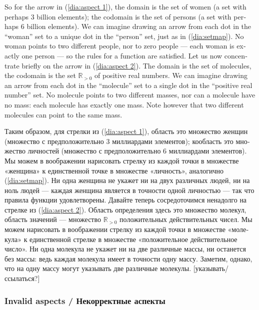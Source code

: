 \documentclass[a4paper]{book}
\def\RR{{\mathbb R}}
\theoremstyle{myth}
\begin{document}
\begin{english}
So for the arrow in (\ref{dia:aspect 1}), the domain is the set of women (a set with perhaps 3 billion elements); the codomain is the set of persons (a set with perhaps 6 billion elements).   We can imagine drawing an arrow from each dot in the “woman” set to a unique dot in the “person” set, just as in (\ref{dia:setmap}).  No woman points to two different people, nor to zero people — each woman is exactly one person — so the rules for a function are satisfied.  Let us now concentrate briefly on the arrow in (\ref{dia:aspect 2}).  The domain is the set of molecules, the codomain is the set $\RR_{>0}$ of positive real numbers.  We can imagine drawing an arrow from each dot in the “molecule” set to a single dot in the “positive real number” set.  No molecule points to two different masses, nor can a molecule have no mass: each molecule has exactly one mass.  Note however that two different molecules can point to the same mass.

\begin{russian}Таким образом, для стрелки из (\ref{dia:aspect 1}), область это множество женщин (множество с предположительно 3 миллиардами элементов); кообласть это множество личностей (множество с предположительно 6 миллиардами элементов).  Мы можем в воображении нарисовать стрелку из каждой точки в множестве «женщина» к единственной точке в множестве «личность», аналогично (\ref{dia:setmap}).  Ни одна женщина не укажет ни на двух различных людей, ни на ноль людей — каждая женщина является в точности одной личностью — так что правила функции удовлетворены.  Давайте теперь сосредоточимся ненадолго на стрелке из (\ref{dia:aspect 2}).  Область определения здесь это множество молекул, область значений — множество $\RR_{>0}$ положительных действительных чисел.  Мы можем нарисовать в воображении стрелку из каждой точки в множестве «молекула» к единственной стрелке в множестве «положительное действительное число».  Ни одна молекула не укажет ни на две различные массы, ни останется без массы: ведь каждая молекула имеет в точности одну массу.  Заметим, однако, что на одну массу могут указывать две различные молекулы. [указывать/ссылаться?] \end{russian}


\subsubsection{Invalid aspects / Некорректные аспекты}\label{sec:invalid aspect}


\end{english}
\end{document}

